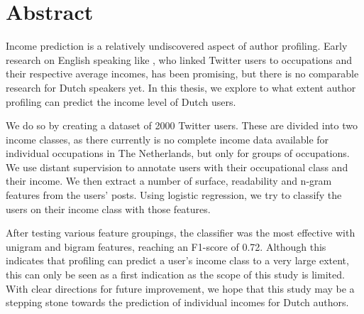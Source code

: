 \documentclass[
10pt, %
a4paper, %
oneside, %
headinclude,footinclude, %
] {book}%
\begin{document}

\chapter*{Abstract}
Income prediction is a relatively undiscovered aspect of author profiling. Early research on English speaking like \citet{flekova}, who linked Twitter users  to occupations and their respective average incomes, has been promising, but there is no comparable research for Dutch speakers yet. In this thesis, we explore to what extent author profiling can predict the income level of Dutch users.

We do so by creating a dataset of 2000 Twitter users. These are divided into two income classes, as there currently is no complete income data available for individual occupations in The Netherlands, but only for groups of occupations. We use distant supervision to annotate users with their occupational class and their income. We then extract a number of surface, readability and n-gram features from the users' posts. Using logistic regression, we try to classify the users on their income class with those features.

After testing various feature groupings, the classifier was the most effective with unigram and bigram features, reaching an F1-score of 0.72. Although this indicates that  profiling can predict a user's income class to a very large extent, this can only be seen as a first indication as the scope of this study is limited. With clear directions for future improvement, we hope that this study may be a stepping stone towards the prediction of individual incomes for Dutch authors.

\clearpage
\setcounter{tocdepth}{3} %
\tableofcontents %


\end{document}
